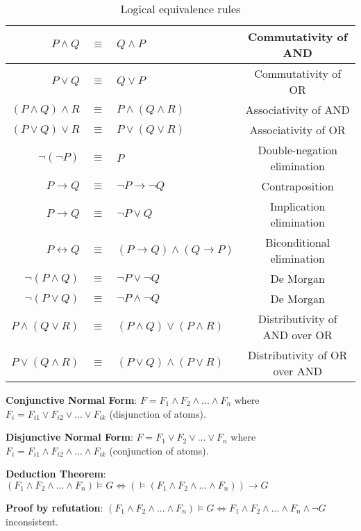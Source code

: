 \documentclass[]{article}
\begin{document}
\begin{table}[h]
	\centering
	\caption{Logical equivalence rules}
	\begin{tabular}{ | r  c  l  c | } 
		\hline
		$P \land Q$ & $\equiv$ & $Q \land P$ & Commutativity of AND\\
		\hline
		$P \lor Q$ & $\equiv$ & $Q \lor P$ & Commutativity of OR\\
		\hline
		$(P \land Q) \land R$ & $\equiv$ & $P \land (Q \land R)$ & Associativity of AND\\
		\hline
		$(P \lor Q) \lor R$ & $\equiv$ & $P \lor (Q \lor R)$ & Associativity of OR\\
		\hline
		$\neg(\neg P)$ & $\equiv$ & $P$ & Double-negation elimination\\
		\hline
		$P \rightarrow Q$ & $\equiv$ & $\neg P \rightarrow \neg Q$ & Contraposition\\
		\hline
		$P \rightarrow Q$ & $\equiv$ & $\neg P \lor Q$ & Implication elimination\\
		\hline
		$P \leftrightarrow Q$ & $\equiv$ & $(P \rightarrow Q) \land (Q \rightarrow P)$ & Biconditional elimination \\
		\hline
		$\neg(P \land Q)$ & $\equiv$ & $\neg P \lor \neg Q$ & De Morgan\\
		\hline
		$\neg(P \lor Q)$ & $\equiv$ & $\neg P \land \neg Q$ & De Morgan\\
		\hline
		$P \land (Q \lor R)$ & $\equiv$ & $(P \land Q) \lor (P \land R)$ & Distributivity of AND over OR\\
		\hline
		$P \lor (Q \land R)$ & $\equiv$ & $(P \lor Q) \land (P \lor R)$ & Distributivity of OR over AND\\
		\hline
	\end{tabular}
\end{table}

\noindent \textbf{Conjunctive Normal Form}: $F = F_1 \land F_2 \land ... \land F_n $ where $F_i = F_{i1} \lor F_{i2} \lor ... \lor F_{ik} $ (disjunction of atoms).

\noindent \textbf{Disjunctive Normal Form}: $F = F_1 \lor F_2 \lor ... \lor F_n $ where $F_i = F_{i1} \land F_{i2} \land ... \land F_{ik} $ (conjunction of atoms).

\noindent \textbf{Deduction Theorem}: $(F_1 \land F_2 \land ... \land F_n) \vDash G \iff (\vDash(F_1 \land F_2 \land ... \land F_n)) \rightarrow G$

\noindent \textbf{Proof by refutation}: $(F_1 \land F_2 \land ... \land F_n) \vDash G \iff F_1 \land F_2 \land ... \land F_n \land \neg G $ inconsistent.
\end{document}
